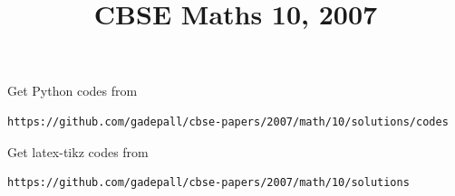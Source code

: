 \documentclass[journal,12pt,twocolumn]{IEEEtran}
\begin{document}
     \def\rightbox#1{\makebox[0in][r]{#1}}
     \def\centbox#1{\makebox[0in]{#1}}
     \def\topbox#1{\raisebox{-\baselineskip}[0in][0in]{#1}}
     \def\midbox#1{\raisebox{-0.5\baselineskip}[0in][0in]{#1}}
\vspace{3cm}
\title{CBSE Maths 10, 2007}
\maketitle
\newpage
\tableofcontents
\bigskip
\renewcommand{\thefigure}{\theenumi}
\renewcommand{\thetable}{\theenumi}
Get Python codes from 
%
\begin{lstlisting}
https://github.com/gadepall/cbse-papers/2007/math/10/solutions/codes
\end{lstlisting}
%
Get latex-tikz codes from 
%
\begin{lstlisting}
https://github.com/gadepall/cbse-papers/2007/math/10/solutions
\end{lstlisting}
\end{document}
